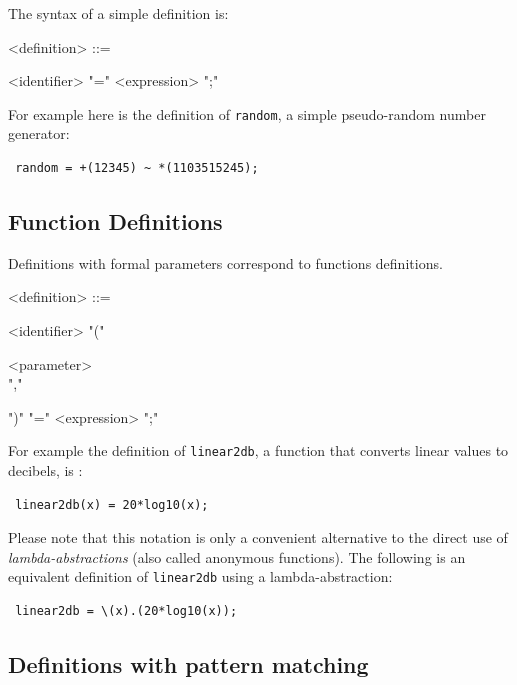 \documentclass[a4paper]{book}
\begin{document}
The syntax of a simple definition is:

\begin{grammar}
  <definition> ::= 
  \begin{syntdiag}
    <identifier> "=" <expression> ";"
  \end{syntdiag}
\end{grammar}

For example here is the definition of \lstinline'random', a simple pseudo-random number generator:

\begin{lstlisting}
 random = +(12345) ~ *(1103515245);
\end{lstlisting}


\subsection{Function Definitions}

Definitions with formal parameters correspond to functions definitions.


\begin{grammar}
  <definition> ::= 
  \begin{syntdiag}
    <identifier> "(" 
    \begin{rep}
      <parameter> \\ ","
    \end{rep}
    ")" "=" <expression> ";"
  \end{syntdiag}
\end{grammar}

For example the definition of \lstinline'linear2db', a function that converts linear values to decibels, is :

\begin{lstlisting}
 linear2db(x) = 20*log10(x);
\end{lstlisting}
 
Please note that this notation is only a convenient alternative to the direct use of \textit{lambda-abstractions} (also called anonymous functions). The following is an equivalent definition of \lstinline'linear2db' using a lambda-abstraction:

\begin{lstlisting}
 linear2db = \(x).(20*log10(x));
\end{lstlisting}


\subsection{Definitions with pattern matching}
\end{document}

